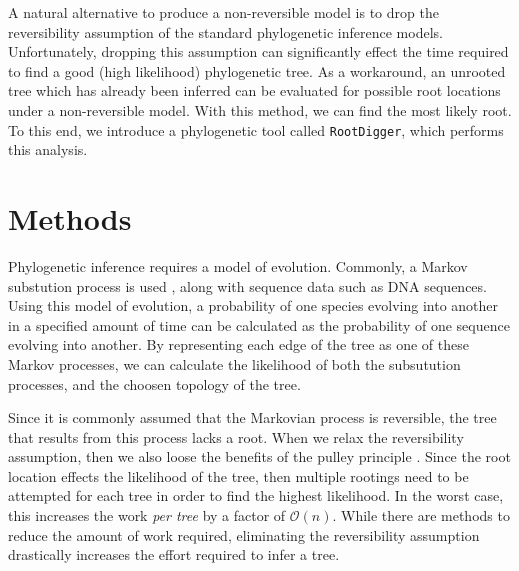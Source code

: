 \documentclass{article}
\newcommand{\RootDiggertt}{\texttt{RootDigger}}
\begin{document}
A natural alternative to produce a non-reversible model is to drop the
reversibility assumption of the standard phylogenetic inference models.
Unfortunately, dropping this assumption can significantly effect the time
required to find a good (high likelihood) phylogenetic tree. As a workaround, an
unrooted tree which has already been inferred can be evaluated for possible root
locations under a non-reversible model. With this method, we can find the most
likely root. To this end, we introduce a phylogenetic tool called \RootDiggertt,
which performs this analysis.

%
%

\section{Methods}

Phylogenetic inference requires a model of evolution. Commonly, a Markov
substution process is used \cite{yang_computational_2006}, along with sequence
data such as DNA sequences.  Using this model of evolution, a probability of one
species evolving into another in a specified amount of time can be calculated as
the probability of one sequence evolving into another. By representing each edge
of the tree as one of these Markov processes, we can calculate the likelihood of
both the subsutution processes, and the choosen topology of the tree.

Since it is commonly assumed that the Markovian process is reversible, the tree
that results from this process lacks a root. When we relax the reversibility
assumption, then we also loose the benefits of the pulley principle
\cite{felsenstein_evolutionary_1981}. Since the root location effects the
likelihood of the tree, then multiple rootings need to be attempted for each
tree in order to find the highest likelihood.  In the worst case, this increases
the work {\em per tree} by a factor of $\mathcal{O}(n)$. While there are methods
to reduce the amount of work required, eliminating the reversibility assumption
drastically increases the effort required to infer a tree.
\end{document}
